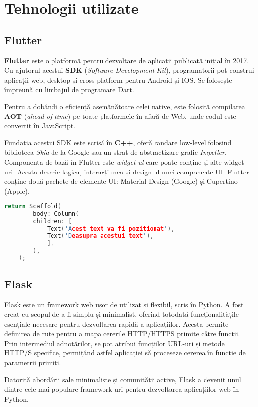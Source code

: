 \chapter{Tehnologii utilizate}

\section{Flutter}

\textbf{Flutter} este o platformă pentru dezvoltare de aplicații publicată inițial în 2017. Cu ajutorul acestui \textbf{SDK} (\emph{Software Development Kit}), programatorii pot construi aplicații web, desktop și cross-platform pentru Android și IOS. Se folosește împreună cu limbajul de programare Dart.

Pentru a dobândi o eficiență asemănătoare celei native, este folosită compilarea \textbf{AOT} (\emph{ahead-of-time}) pe toate platformele în afară de Web, unde codul este convertit în JavaScript.

Fundația acestui SDK este scrisă în \textbf{C++}, oferă randare low-level folosind biblioteca \emph{Skia} de la Google sau un strat de abstractizare grafic \emph{Impeller}. Componenta de bază în Flutter este \emph{widget-ul} care poate conține și alte widget-uri. Acesta descrie logica, interacțiunea și design-ul unei componente UI. Flutter conține două pachete de elemente UI: Material Design (Google) și Cupertino (Apple).

\begin{lstlisting}[language=C++, caption=Widget Scaffold]
	return Scaffold(
		body: Column(
		children: [
			Text('Acest text va fi pozitionat'),
			Text('Deasupra acestui text'),
			],
		),
	);
\end{lstlisting}

\section{Flask}

Flask este un framework web ușor de utilizat și flexibil, scris în Python. A fost creat cu scopul de a fi simplu și minimalist, oferind totodată funcționalitățile esențiale necesare pentru dezvoltarea rapidă a aplicațiilor. Acesta permite definirea de rute pentru a mapa cererile HTTP/HTTPS primite către funcții. Prin intermediul adnotărilor, se pot atribui funcțiilor URL-uri și metode HTTP/S specifice, permițând astfel aplicației să proceseze cererea în funcție de parametrii primiți.

Datorită abordării sale minimaliste și comunității active, Flask a devenit unul dintre cele mai populare framework-uri pentru dezvoltarea aplicațiilor web în Python.

